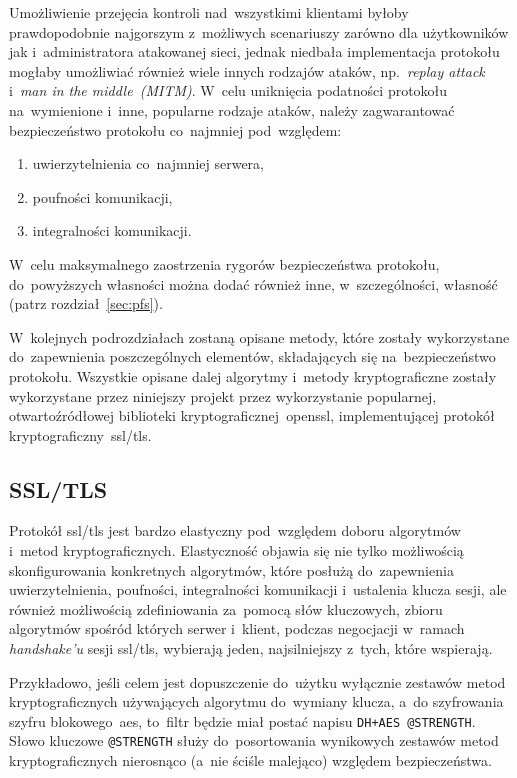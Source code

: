 \documentclass[thesis]{subfiles}
\begin{document}
Umożliwienie przejęcia kontroli nad~wszystkimi klientami byłoby prawdopodobnie najgorszym z~możliwych scenariuszy zarówno dla użytkowników jak i~administratora atakowanej sieci, jednak niedbała implementacja protokołu mogłaby umożliwiać również wiele innych rodzajów ataków, np.~\emph{replay attack} i~\emph{man in the middle~(MITM)}. W~celu uniknięcia podatności protokołu na~wymienione i~inne, popularne rodzaje ataków, należy zagwarantować bezpieczeństwo protokołu co~najmniej pod~względem:
\begin{enumerate}
\item uwierzytelnienia co~najmniej serwera,
\item poufności komunikacji,
\item integralności komunikacji.
\end{enumerate}
W~celu maksymalnego zaostrzenia rygorów bezpieczeństwa protokołu, do~powyższych własności można dodać również inne, w~szczególności, własność \emph{} (patrz rozdział~\ref{sec:pfs}).

W~kolejnych podrozdziałach zostaną opisane metody, które zostały wykorzystane do~zapewnienia poszczególnych elementów, składających się na~bezpieczeństwo protokołu. Wszystkie opisane dalej algorytmy i~metody kryptograficzne zostały wykorzystane przez niniejszy projekt przez wykorzystanie popularnej, otwartoźródłowej biblioteki kryptograficznej~\gls{openssl}, implementującej protokół kryptograficzny~\gls{ssl/tls}.


\subsection{SSL/TLS}
\label{sec:ssl-tls}

Protokół \gls{ssl/tls} jest bardzo elastyczny pod~względem doboru algorytmów i~metod kryptograficznych. Elastyczność objawia się nie tylko możliwością skonfigurowania konkretnych algorytmów, które posłużą do~zapewnienia uwierzytelnienia, poufności, integralności komunikacji i~ustalenia klucza sesji, ale również możliwością zdefiniowania za~pomocą słów kluczowych, zbioru algorytmów spośród których serwer i~klient, podczas negocjacji w~ramach \emph{handshake'u} sesji \gls{ssl/tls}, wybierają jeden, najsilniejszy z~tych, które wspierają.

Przykładowo, jeśli celem jest dopuszczenie do~użytku wyłącznie zestawów metod kryptograficznych używających algorytmu  do~wymiany klucza, a~do szyfrowania szyfru blokowego~\gls{aes}, to~filtr będzie miał postać napisu \texttt{DH+AES @STRENGTH}. Słowo kluczowe \texttt{@STRENGTH} służy do~posortowania wynikowych zestawów metod kryptograficznych nierosnąco (a~nie ściśle malejąco) względem bezpieczeństwa.
\end{document}
